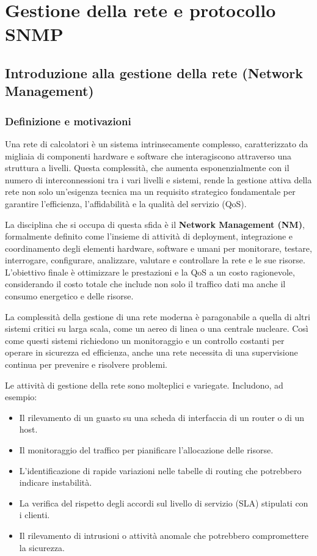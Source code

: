 \section{Gestione della rete e protocollo SNMP}

\subsection{Introduzione alla gestione della rete (Network Management)}

\subsubsection{Definizione e motivazioni}

Una rete di calcolatori è un sistema intrinsecamente complesso, caratterizzato
da migliaia di componenti hardware e software che interagiscono attraverso una
struttura a livelli. Questa complessità, che aumenta esponenzialmente con il
numero di interconnessioni tra i vari livelli e sistemi, rende la gestione
attiva della rete non solo un'esigenza tecnica ma un requisito strategico
fondamentale per garantire l'efficienza, l'affidabilità e la qualità del
servizio (QoS).

La disciplina che si occupa di questa sfida è il \textbf{Network Management (NM)},
formalmente definito come l'insieme di attività di deployment, integrazione e
coordinamento degli elementi hardware, software e umani per monitorare, testare,
interrogare, configurare, analizzare, valutare e controllare la rete e le sue
risorse. L'obiettivo finale è ottimizzare le prestazioni e la QoS a un costo
ragionevole, considerando il costo totale che include non solo il traffico dati
ma anche il consumo energetico e delle risorse.

La complessità della gestione di una rete moderna è paragonabile a quella di
altri sistemi critici su larga scala, come un aereo di linea o una centrale
nucleare. Così come questi sistemi richiedono un monitoraggio e un controllo
costanti per operare in sicurezza ed efficienza, anche una rete necessita di una
supervisione continua per prevenire e risolvere problemi.

Le attività di gestione della rete sono molteplici e variegate. Includono, ad
esempio:
\begin{itemize}
\item Il rilevamento di un guasto su una scheda di interfaccia di un router o
di un host.
\item Il monitoraggio del traffico per pianificare l'allocazione delle risorse.
\item L'identificazione di rapide variazioni nelle tabelle di routing che
potrebbero indicare instabilità.
\item La verifica del rispetto degli accordi sul livello di servizio (SLA)
stipulati con i clienti.
\item Il rilevamento di intrusioni o attività anomale che potrebbero
compromettere la sicurezza.
\end{itemize}

